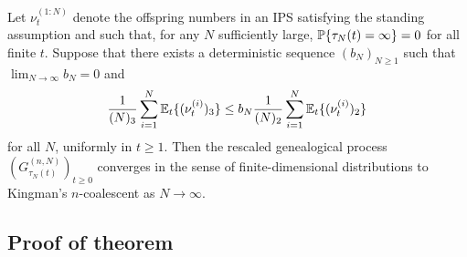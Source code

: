 \begin{theorem}\label{thm:FDDconv}
Let $\nu_t^{(1:N)}$ denote the offspring numbers in an IPS satisfying the standing assumption and such that, for any $N$ sufficiently large, $\mathbb{P}\{ \tau_N(t) = \infty \} =0$ for all finite $t$. Suppose that there exists a deterministic sequence $(b_N)_{N\geq1}$ such that ${\lim}_{N\to\infty} b_N =0$ and
\begin{equation}\label{eq:mainthmcond}
\frac{1}{(N)_3} \sum_{i = 1}^N \mathbb{E}_t\{ (\nu_t^{(i)})_3 \}  \leq b_N \frac{1}{(N)_2} \sum_{i = 1}^N \mathbb{E}_t\{ (\nu_t^{(i)})_2 \}
\end{equation}
for all $N$, uniformly in $t \geq 1$.
Then the rescaled genealogical process $(G_{\tau_N(t)}^{(n,N)})_{t\geq0}$ converges in the sense of finite-dimensional distributions to Kingman's $n$-coalescent as $N \to \infty$.
\end{theorem}



\subsection{Proof of theorem}
